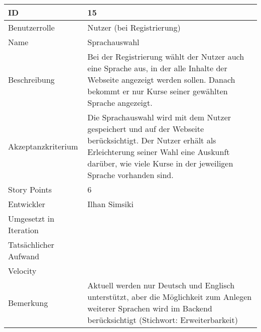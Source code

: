 \begin{tabularx}{\textwidth}{|p{}|X|}
	\hline
	ID & 15\\
	\hline
	Benutzerrolle & Nutzer (bei Registrierung)\\
	\hline
	Name & Sprachauswahl\\
	\hline
	Beschreibung & Bei der Registrierung wählt der Nutzer auch eine Sprache aus, in der alle Inhalte der Webseite angezeigt werden sollen. Danach bekommt er nur Kurse seiner gewählten Sprache angezeigt.\\
	\hline
	Akzeptanzkriterium & Die Sprachauswahl wird mit dem Nutzer gespeichert und auf der Webseite berücksichtigt. Der Nutzer erhält als  Erleichterung seiner Wahl eine Auskunft darüber, wie viele Kurse in der jeweiligen Sprache vorhanden sind.\\
	\hline
	Story Points & 6\\
	\hline
	Entwickler & Ilhan Simsiki\\
	\hline
	Umgesetzt in Iteration & \\
	\hline
	Tatsächlicher Aufwand & \\
	\hline
	Velocity & \\
	\hline
	Bemerkung & Aktuell werden nur Deutsch und Englisch unterstützt, aber die Möglichkeit zum Anlegen weiterer Sprachen wird im Backend berücksichtigt (Stichwort: Erweiterbarkeit)\\
	\hline
\end{tabularx}
\vspace{20pt}
